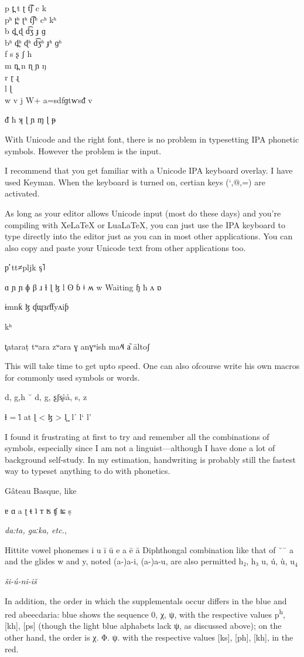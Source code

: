 \LARGE
\noindent p t̪ t ʈ t͡ʃ c k\\
pʰ t̪ʰ ʈʰ t͡ʃʰ cʰ kʰ \\
b d̪ ɖ d͡ʒ ɟ ɡ \\
bʱ d̪ʱ ɖʱ d͡ʒʱ ɟʱ ɡʱ \\
f s ʂ ʃ h \\
m n̪ n ɳ ɲ ŋ \\
r ɽ ͏ɻ\\
l ɭ \\
w v j
W+ 
a=sdfɡtⱳsᵭ v

ᵭ ħ ʞ ɭ ɲ ɱ ɭ ᵽ 
\egroup


With Unicode and the right font, there is no problem  in typesetting IPA phonetic symbols. However the problem is the input.

I recommend that you get familiar with a Unicode IPA keyboard overlay. I have used Keyman. When the keyboard is turned on, certian keys (`,@,=) are activated.

As long as your editor allows Unicode input (most do these days) and you're compiling with XeLaTeX or LuaLaTeX, you can just use the IPA keyboard to type directly into the editor just as you can in most other applications. You can also copy and paste your Unicode text from other applications too.

p̛ tt≠pljk ᶊ˥



ɑ ɲ ɲ ɸ β ɹ ɬ ɭ ɮ l ʘ ɓ ǂ ʍ w Waiting ɧ ħ ʌ ɒ 

ɨmnƙ ɮ ʠɰɜɾƭƭyʌiƥ

kʰ 

t̥ataraṭ tʷara zʷara ɣ anɣᵘish ma˨˥˨ a᷅ āltoʃ

This will take time to get upto speed. One can also ofcourse write his own macros for commonly used symbols or words.

d, g,h
˘
d, g, ʂʃs̥s̊å, s, z 

ɬ = 
l̊ at
ɭ  < 
ɮ  >
l̥  ̥
lˈ 
l` l'

I found it frustrating at first to try and remember all the combinations of symbols, especially since I am not a linguist---although I have done a lot of background self-study. In my estimation, handwriting is probably still the fastest way to typeset anything to do with phonetics.

Gâteau Basque, like


ɐ ɑ a ʈ ᵵ ʇ ᴛ ʦ ʧ ʨ ṣ

\textit{da:ta, gaːka, etc.}, 

Hittite vowel phonemes
{\obeylines\large\panunicode
i u ī ū
e a ē ā 
}
Diphthongal combination like that of ˘¯ a and the glides w and y, noted (a-)a-i, (a-)a-u, are
also permitted h₂, h₃
 u, ú, ù, u$_4$


\emph{ši-ú-ni-iš} 

In addition, the order in which the supplementals occur differs in the blue
and red abeecdaria: blue shows the sequence 0, χ, ψ, with the respective values
p\textsuperscript{h}, [kh], [ps] (though the light blue alphabets lack ψ, as discussed above); on
the other hand, the order is χ. Φ. ψ. with the respective values [ks], [ph], [kh],
in the red.
